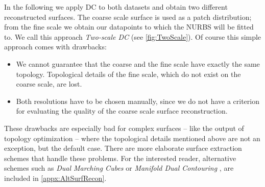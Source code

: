 In the following we apply \ac{DC} to both datasets and obtain two different reconstructed surfaces.
The coarse scale surface is used as a patch distribution; from the fine scale we obtain our datapoints to which the \ac{NURBS} will be fitted to. We call this approach \emph{Two-scale \acl{DC}} (see \autoref{fig:TwoScale}).
Of course this simple approach comes with drawbacks:
\begin{itemize}
\item We cannot guarantee that the coarse and the fine scale have exactly the same topology. Topological details of the fine scale, which do not exist on the coarse scale, are lost.
\item Both resolutions have to be chosen manually, since we do not have a criterion for evaluating the quality of the coarse scale surface reconstruction.
\end{itemize}
These drawbacks are especially bad for complex surfaces -- like the output of topology optimization -- where the topological details mentioned above are not an exception, but the default case. There are more elaborate surface extraction schemes that handle these problems. For the interested reader, alternative schemes such as \emph{Dual Marching Cubes} \cite{ScottSchaefer2004} or \emph{Manifold Dual Contouring} \cite{Schaefer2007}, are included in \autoref{appx:AltSurfRecon}.
